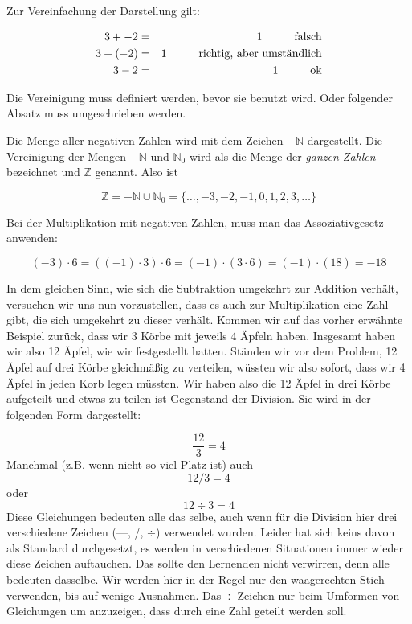 Zur Vereinfachung der Darstellung gilt:

\begin{eqnarray*}
3 + -2 &=& 1 \hspace{1cm}\textnormal{falsch}\\
3 + (-2) &=& 1 \hspace{1cm}\textnormal{richtig, aber umständlich}\\
3 - 2  &=& 1 \hspace{1cm}\textnormal{ok}
\end{eqnarray*}

\begin{TODO}
Die Vereinigung muss definiert werden, bevor sie benutzt wird. Oder folgender Absatz muss umgeschrieben werden.
\end{TODO}
Die Menge aller negativen Zahlen wird mit dem Zeichen $-\mathbb{N} $ dargestellt. Die Vereinigung der Mengen $-\mathbb{N} $ und $\mathbb{N}_0$ wird als die Menge der \emph{ganzen Zahlen} bezeichnet und $\mathbb{Z}$ genannt. Also ist 

\[
\mathbb{Z} = -\mathbb{N} \cup \mathbb{N}_0 =  \{  \dots, -3, -2, -1, 0, 1, 2, 3, \dots \}
\]

Bei der Multiplikation mit negativen Zahlen, muss man das Assoziativgesetz anwenden:

\[ (-3)\cdot 6 = ((-1)\cdot 3) \cdot 6 = (-1)\cdot (3\cdot 6) = (-1)\cdot (18) = -18 \]

In dem gleichen Sinn, wie sich die Subtraktion umgekehrt zur Addition verhält, versuchen wir uns nun vorzustellen, dass es auch zur Multiplikation eine Zahl gibt, die sich umgekehrt zu dieser verhält. Kommen wir auf das vorher erwähnte Beispiel zurück, dass wir 3 Körbe mit jeweils 4 Äpfeln haben. Insgesamt haben wir also 12 Äpfel, wie wir festgestellt hatten. Ständen wir vor dem Problem, 12 Äpfel auf drei Körbe gleichmäßig zu verteilen, wüssten wir also sofort, dass wir 4 Äpfel in jeden Korb legen müssten. Wir haben also die 12 Äpfel in drei Körbe aufgeteilt und etwas zu teilen ist Gegenstand der Division. Sie wird in der folgenden Form dargestellt:

\[ \frac{12}{3} = 4 \] 
Manchmal (z.B. wenn nicht so viel Platz ist) auch
\[ 12 / 3 = 4 \]
oder
\[ 12 \div 3 = 4 \]
Diese Gleichungen bedeuten alle das selbe, auch wenn für die Division hier drei verschiedene Zeichen (---, /, $\div$) verwendet wurden. Leider hat sich keins davon als Standard durchgesetzt, es werden in verschiedenen Situationen immer wieder diese Zeichen auftauchen. Das sollte den Lernenden nicht verwirren, denn alle bedeuten dasselbe. Wir werden hier in der Regel nur den waagerechten Stich verwenden, bis auf wenige Ausnahmen. Das $\div$ Zeichen nur beim Umformen von Gleichungen um anzuzeigen, dass durch eine Zahl geteilt werden soll.

